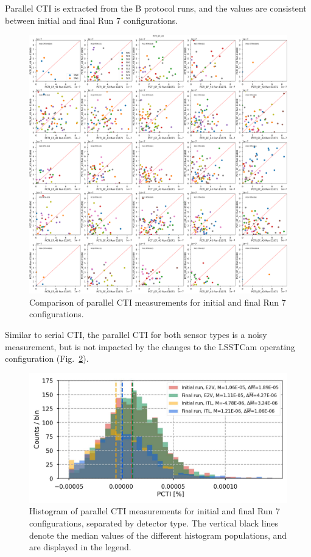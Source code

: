 Parallel CTI is extracted from the B protocol runs, and the values are consistent between initial and final Run 7 configurations.

\begin{figure}[ht]
    \centering
    \includegraphics[width=0.7\linewidth]{figures/finalCharacterization/E1071_E1880_PCTI_EF_43_inset.png}
    \caption{Comparison of parallel CTI measurements for initial and final Run 7 configurations.}
    \label{fig:finalChar-PCTI-5x5}
\end{figure}

Similar to serial CTI, the parallel CTI for both sensor types is a noisy measurement, but is not impacted by the changes to the LSSTCam operating configuration (Fig.~\ref{fig:finalChar-PCTI-hist}).

\begin{figure}[ht]
    \centering
    \includegraphics[width=0.7\linewidth]{figures/finalCharacterization/PCTIComp(3).jpg}
    \caption{Histogram of parallel CTI measurements for initial and final Run 7 configurations, separated by detector type. The vertical black lines denote the median values of the different histogram populations, and are displayed in the legend.}
    \label{fig:finalChar-PCTI-hist}
\end{figure}

